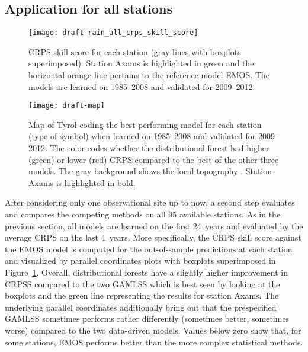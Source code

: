 \documentclass[aoas, preprint]{imsart}
\numberwithin{equation}{subsection}
\begin{document}

\subsection{Application for all stations}
\label{sec:all}


\begin{figure}[t!]
\centering
{}
\texttt{[image: draft-rain\_all\_crps\_skill\_score]}
\caption{\label{fig:all-crps}CRPS skill score for each station (gray lines
with boxplots superimposed). Station Axams is highlighted in green 
and the horizontal orange line pertains to the reference model EMOS. The models are 
learned on 1985--2008 and validated for 2009--2012.}
\end{figure}

\begin{figure}[t!]
\centering
{}
\texttt{[image: draft-map]}
\caption{\label{fig:all-map}Map of Tyrol coding the best-performing model
for each station (type of symbol) when learned on 1985--2008 and validated for 2009--2012.
The color codes whether the distributional 
forest had higher (green) or lower (red) CRPS compared to the best of the 
other three models. The gray background shows the local topography \citep{Robinson:2014}.
Station Axams is highlighted in bold.}
\end{figure}


After considering only one observational site up to now, a second step
evaluates and compares the competing methods on all 95 available stations. As in the previous
section, all models are learned on the first 24~years and evaluated by the
average CRPS on the last 4~years. More specifically, the CRPS skill score
against the EMOS model is computed for the out-of-sample predictions at each
station and visualized by parallel coordinates plots with boxplots superimposed
in Figure~\ref{fig:all-crps}. Overall, distributional forests have a slightly
higher improvement in CRPSS compared to the two GAMLSS which is best seen
by looking at the boxplots and the green line representing the results
for station Axams. The underlying parallel coordinates additionally
bring out that the prespecified GAMLSS sometimes performs rather differently
(sometimes better, sometimes worse) compared to the two data-driven models.
Values below zero show that, for some stations, EMOS performs better
than the more complex statistical methods.
\end{document}
